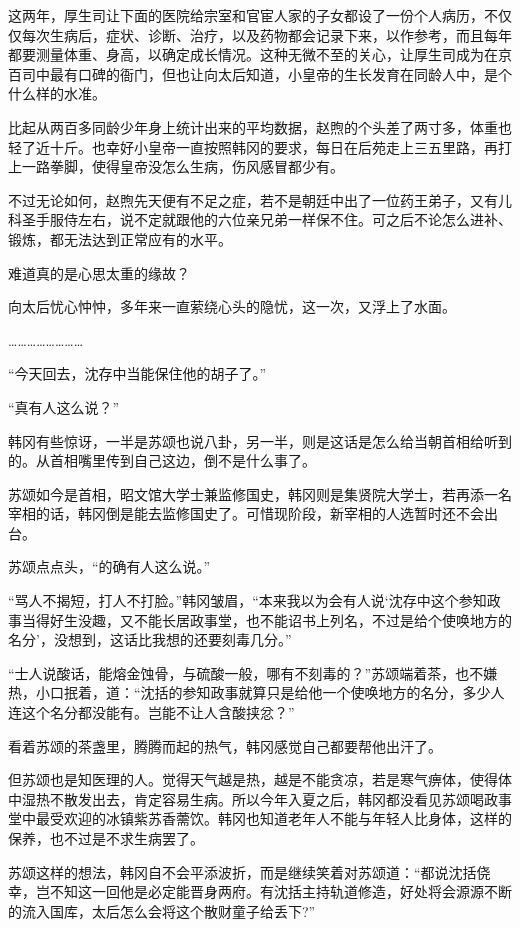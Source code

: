 这两年，厚生司让下面的医院给宗室和官宦人家的子女都设了一份个人病历，不仅仅每次生病后，症状、诊断、治疗，以及药物都会记录下来，以作参考，而且每年都要测量体重、身高，以确定成长情况。这种无微不至的关心，让厚生司成为在京百司中最有口碑的衙门，但也让向太后知道，小皇帝的生长发育在同龄人中，是个什么样的水准。

比起从两百多同龄少年身上统计出来的平均数据，赵煦的个头差了两寸多，体重也轻了近十斤。也幸好小皇帝一直按照韩冈的要求，每日在后苑走上三五里路，再打上一路拳脚，使得皇帝没怎么生病，伤风感冒都少有。

不过无论如何，赵煦先天便有不足之症，若不是朝廷中出了一位药王弟子，又有儿科圣手服侍左右，说不定就跟他的六位亲兄弟一样保不住。可之后不论怎么进补、锻炼，都无法达到正常应有的水平。

难道真的是心思太重的缘故？

向太后忧心忡忡，多年来一直萦绕心头的隐忧，这一次，又浮上了水面。

……………………

“今天回去，沈存中当能保住他的胡子了。”

“真有人这么说？”

韩冈有些惊讶，一半是苏颂也说八卦，另一半，则是这话是怎么给当朝首相给听到的。从首相嘴里传到自己这边，倒不是什么事了。

苏颂如今是首相，昭文馆大学士兼监修国史，韩冈则是集贤院大学士，若再添一名宰相的话，韩冈倒是能去监修国史了。可惜现阶段，新宰相的人选暂时还不会出台。

苏颂点点头，“的确有人这么说。”

“骂人不揭短，打人不打脸。”韩冈皱眉，“本来我以为会有人说‘沈存中这个参知政事当得好生没趣，又不能长居政事堂，也不能诏书上列名，不过是给个使唤地方的名分’，没想到，这话比我想的还要刻毒几分。”

“士人说酸话，能熔金蚀骨，与硫酸一般，哪有不刻毒的？”苏颂端着茶，也不嫌热，小口抿着，道：“沈括的参知政事就算只是给他一个使唤地方的名分，多少人连这个名分都没能有。岂能不让人含酸挟忿？”

看着苏颂的茶盏里，腾腾而起的热气，韩冈感觉自己都要帮他出汗了。

但苏颂也是知医理的人。觉得天气越是热，越是不能贪凉，若是寒气痹体，使得体中湿热不散发出去，肯定容易生病。所以今年入夏之后，韩冈都没看见苏颂喝政事堂中最受欢迎的冰镇紫苏香薷饮。韩冈也知道老年人不能与年轻人比身体，这样的保养，也不过是不求生病罢了。

苏颂这样的想法，韩冈自不会平添波折，而是继续笑着对苏颂道：“都说沈括侥幸，岂不知这一回他是必定能晋身两府。有沈括主持轨道修造，好处将会源源不断的流入国库，太后怎么会将这个散财童子给丢下?”

